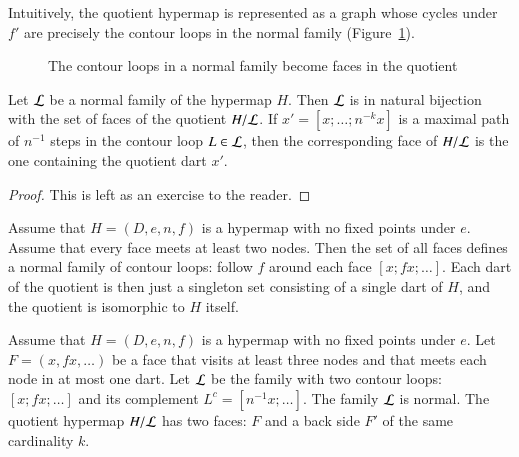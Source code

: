 Intuitively, the quotient hypermap is represented as a graph whose
cycles under $f'$ are precisely the contour loops in the normal family
(Figure~\ref{fig:quot}).


\begin{figure}[htb]
\centering
{}
\caption{The contour loops in a normal family become faces in the
quotient}
\label{fig:quot}
\end{figure}

\begin{lemma}\label{lemma:quotient-bijection}
Let ${\cal L}$ be a normal family of the hypermap $H$.  Then ${\cal L}$ is in
natural bijection with the set of faces
of the quotient $H/{\cal L}$.  If $x'=[x;\ldots;n^{-k}x]$ is a maximal path of $n^{-1}$ steps in
the contour loop
$L\in{\cal L}$, then the corresponding face of $H/{\cal L}$ is the one containing the
quotient dart $x'$.
\end{lemma}

\begin{proof}  This is left as an exercise to the reader.
\end{proof}


\begin{example}\label{ex:Hall} 
Assume that $H=(D,e,n,f)$ is a hypermap with no fixed points under $e$. Assume
that every face meets at least two nodes. Then the set of all faces
defines a normal family of contour loops: follow $f$ around each
face $[x;f x;\ldots]$.  Each dart of the quotient is then just a
singleton set consisting of a single dart of $H$, and the quotient
is isomorphic to $H$ itself.
\end{example}

\begin{example}\label{ex:H2} 
Assume that $H=(D,e,n,f)$ is a hypermap with no fixed points
under $e$.  Let $F = (x,f x,\ldots)$ be a face 
that visits at least
three nodes and that meets each node in at most one dart.
Let $\cal L$ be the
family with two contour loops:  $[x;f x;\ldots]$ and its
complement $L^c = [n^{-1} x;\ldots]$.
The family $\cal L$ is normal. The quotient hypermap $H/{\cal L}$ has
two faces: $F$ and a back side $F'$ of the same cardinality $k$.
%
\end{example}

